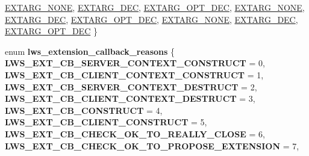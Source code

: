 \begin{DoxyCompactItemize}
\hyperlink{group__extensions_ggacc9f55936dc165257a2e1f7d47bce89eaabcf56c456c1ff6e81dc82586a16f14c}{E\+X\+T\+A\+R\+G\+\_\+\+N\+O\+NE}, 
\hyperlink{group__extensions_ggacc9f55936dc165257a2e1f7d47bce89ea1c86adf924c8786a12bee9687094673e}{E\+X\+T\+A\+R\+G\+\_\+\+D\+EC}, 
\newline
\hyperlink{group__extensions_ggacc9f55936dc165257a2e1f7d47bce89ea5265abe3e1c3f64412f2affe7bffd880}{E\+X\+T\+A\+R\+G\+\_\+\+O\+P\+T\+\_\+\+D\+EC}, 
\hyperlink{group__extensions_ggacc9f55936dc165257a2e1f7d47bce89eaabcf56c456c1ff6e81dc82586a16f14c}{E\+X\+T\+A\+R\+G\+\_\+\+N\+O\+NE}, 
\hyperlink{group__extensions_ggacc9f55936dc165257a2e1f7d47bce89ea1c86adf924c8786a12bee9687094673e}{E\+X\+T\+A\+R\+G\+\_\+\+D\+EC}, 
\hyperlink{group__extensions_ggacc9f55936dc165257a2e1f7d47bce89ea5265abe3e1c3f64412f2affe7bffd880}{E\+X\+T\+A\+R\+G\+\_\+\+O\+P\+T\+\_\+\+D\+EC}, 
\newline
\hyperlink{group__extensions_ggacc9f55936dc165257a2e1f7d47bce89eaabcf56c456c1ff6e81dc82586a16f14c}{E\+X\+T\+A\+R\+G\+\_\+\+N\+O\+NE}, 
\hyperlink{group__extensions_ggacc9f55936dc165257a2e1f7d47bce89ea1c86adf924c8786a12bee9687094673e}{E\+X\+T\+A\+R\+G\+\_\+\+D\+EC}, 
\hyperlink{group__extensions_ggacc9f55936dc165257a2e1f7d47bce89ea5265abe3e1c3f64412f2affe7bffd880}{E\+X\+T\+A\+R\+G\+\_\+\+O\+P\+T\+\_\+\+D\+EC}
 \}
\item 
\mbox{\label{group__extensions_gae9993815eee72c6070300a0ae2f022d7}} 
enum {\bfseries lws\+\_\+extension\+\_\+callback\+\_\+reasons} \{ \newline
{\bfseries L\+W\+S\+\_\+\+E\+X\+T\+\_\+\+C\+B\+\_\+\+S\+E\+R\+V\+E\+R\+\_\+\+C\+O\+N\+T\+E\+X\+T\+\_\+\+C\+O\+N\+S\+T\+R\+U\+CT} = 0, 
{\bfseries L\+W\+S\+\_\+\+E\+X\+T\+\_\+\+C\+B\+\_\+\+C\+L\+I\+E\+N\+T\+\_\+\+C\+O\+N\+T\+E\+X\+T\+\_\+\+C\+O\+N\+S\+T\+R\+U\+CT} = 1, 
{\bfseries L\+W\+S\+\_\+\+E\+X\+T\+\_\+\+C\+B\+\_\+\+S\+E\+R\+V\+E\+R\+\_\+\+C\+O\+N\+T\+E\+X\+T\+\_\+\+D\+E\+S\+T\+R\+U\+CT} = 2, 
{\bfseries L\+W\+S\+\_\+\+E\+X\+T\+\_\+\+C\+B\+\_\+\+C\+L\+I\+E\+N\+T\+\_\+\+C\+O\+N\+T\+E\+X\+T\+\_\+\+D\+E\+S\+T\+R\+U\+CT} = 3, 
\newline
{\bfseries L\+W\+S\+\_\+\+E\+X\+T\+\_\+\+C\+B\+\_\+\+C\+O\+N\+S\+T\+R\+U\+CT} = 4, 
{\bfseries L\+W\+S\+\_\+\+E\+X\+T\+\_\+\+C\+B\+\_\+\+C\+L\+I\+E\+N\+T\+\_\+\+C\+O\+N\+S\+T\+R\+U\+CT} = 5, 
{\bfseries L\+W\+S\+\_\+\+E\+X\+T\+\_\+\+C\+B\+\_\+\+C\+H\+E\+C\+K\+\_\+\+O\+K\+\_\+\+T\+O\+\_\+\+R\+E\+A\+L\+L\+Y\+\_\+\+C\+L\+O\+SE} = 6, 
{\bfseries L\+W\+S\+\_\+\+E\+X\+T\+\_\+\+C\+B\+\_\+\+C\+H\+E\+C\+K\+\_\+\+O\+K\+\_\+\+T\+O\+\_\+\+P\+R\+O\+P\+O\+S\+E\+\_\+\+E\+X\+T\+E\+N\+S\+I\+ON} = 7, 

\end{DoxyCompactItemize}
